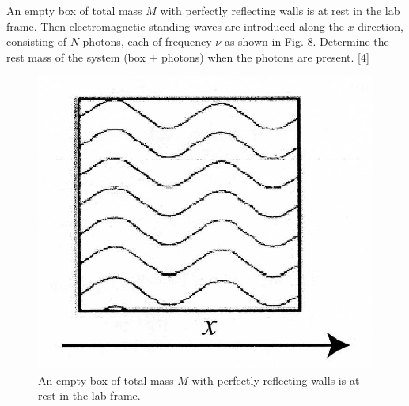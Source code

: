 \begin{problem}
    An empty box of total mass $M$ with perfectly reflecting walls is at rest in the lab frame. Then electromagnetic standing waves are introduced along the $x$ direction, consisting of $N$ photons, each of frequency $\nu$ as shown in Fig. 8. Determine the rest mass of the system (box + photons) when the photons are present. \hfill{[4]}
    \begin{figure}[h]
	    \centering
	    \includegraphics[width=0.5\linewidth]{spho_book_TYS_images/2010q10.png}
	    \caption{An empty box of total mass $M$ with perfectly reflecting walls is at rest in the lab frame.}
    \end{figure}
\end{problem}